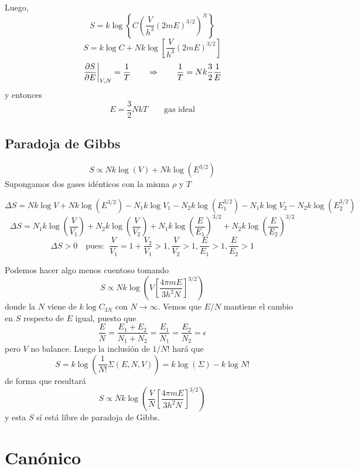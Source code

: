 \documentclass[10pt,oneside]{CBFT_book}
\begin{document}
Luego,
\[
	S = k \log \left\{ C\left( \frac{V}{h^3}(2mE)^{3/2}\right)^N \right\}
\]
\[
	S = k \log C + N k \log \left[ \frac{V}{h^3}(2mE)^{3/2}\right]
\]
\[
	\left. \frac{\partial^{\hspace{-0.05em}} {S}}{\partial {E}^{\hspace{-0.05em}}} \right|_{V,N} = \frac{1}{T} \qquad \Rightarrow \qquad \frac{1}{T} = Nk\frac{3}{2}\frac{1}{E}
\]
y entonces
\[
	E = \frac{3}{2} NkT \qquad \text{gas ideal}
\]

\subsection{Paradoja de Gibbs}

\[
	S \propto Nk\log(V) + Nk \log (E^{3/2})
\]
Supongamos dos gases idénticos con la misma $\rho$ y $T$

\[
	\Delta S = Nk \log V + Nk \log (E^{3/2}) - N_1k \log V_1 - N_2k \log (E_1^{3/2})
	- N_1k \log V_2 - N_2k \log (E_2^{3/2})
\]
\[
	\Delta S = N_1 k \log \left( \frac{V}{V_1} \right) + N_2 k \log \left( \frac{V}{V_2} \right) +
		N_1 k \log \left( \frac{E}{E_1} \right)^{3/2} + N_2 k \log \left( \frac{E}{E_2} \right)^{3/2}
\]
\[
	\Delta S > 0 \quad \text{pues: } \; \frac{V}{V_1} = 1 + \frac{V_2}{V_1} > 1, \frac{V}{V_2} > 1, 
	\frac{E}{E_1} > 1, \frac{E}{E_2} > 1
\]

Podemos hacer algo menos cuentoso tomando
\[
	S \propto Nk\log \left( V\left[ \frac{4\pi m E}{3 h^2 N} \right]^{3/2} \right)
\]
donde la $N$ viene de $k\log C_{3N}$ con $N \to \infty$. Vemos que $E/N$ mantiene el cambio en $S$ respecto de $E$
igual, puesto que 
\[
	\frac{E}{N} = \frac{E_1 + E_2}{N_1 + N_2} = \frac{E_1}{N_1} = \frac{E_2}{N_2} = \epsilon
\]
pero $V$ no balance. Luego la inclusión de $1/N!$ hará que 
\[
	S = k \log (\frac{1}{N!}\Sigma(E,N,V)) = k \log (\Sigma) - k\log N!
\]
de forma que resultará
\[
	S \propto Nk\log \left( \frac{V}{N}\left[ \frac{4\pi m E}{3 h^2 N} \right]^{3/2} \right)
\]
y esta $S$ sí está libre de paradoja de Gibbs.

\section{Canónico}
\end{document}
